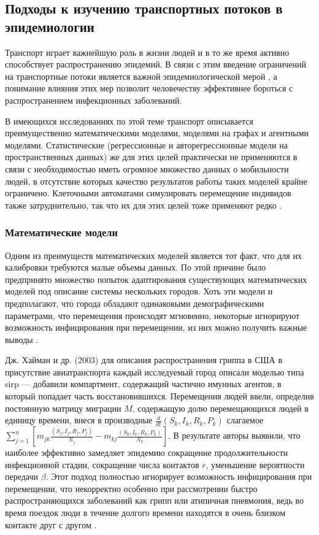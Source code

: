 \documentclass[a4paper,12pt]{article} %
\begin{document}
\subsection{Подходы к изучению транспортных потоков в эпидемиологии}
Транспорт играет важнейшую роль в жизни людей и в то же время активно способствует распространению эпидемий. В связи с этим введение ограничений на транспортные потоки является важной эпидемиологической мерой \cite{li2021modeling}, а понимание влияния этих мер позволит человечеству эффективнее бороться с распространением инфекционных заболеваний.

В имеющихся исследованиях по этой теме транспорт описывается преимущественно математическими моделями, моделями на графах и агентными моделями. Статистические (регрессионные и авторегрессионные модели на пространственных данных) же для этих целей практически не применяются в связи с необходимостью иметь огромное множество данных о мобильности людей, в отсутствие которых качество результатов работы таких моделей крайне ограничено. Клеточными автоматами симулировать перемещение индивидов также затруднительно, так что их для этих целей тоже применяют редко \cite{li2021modeling}.

\subsubsection{Математические модели}
Одним из преимуществ математических моделей является тот факт, что для их калибровки требуются малые объемы данных. По этой причине было предпринято множество попыток адаптирования существующих математических моделей под описание системы нескольких городов. Хоть эти модели и предполагают, что города обладают одинаковыми демографическими параметрами, что перемещения происходят мгновенно, некоторые игнорируют возможность инфицирования при перемещении, из них можно получить важные выводы \cite{li2021modeling}.

Дж. Хайман и др. (2003) \cite{hyman2003modeling} для описания распространения гриппа в США в присутствие авиатранспорта каждый исследуемый город описали моделью типа \gls{sirp} --- добавили компартмент, содержащий частично имунных агентов, в который попадает часть восстановившихся. Перемещения людей ввели, определив постоянную матрицу миграции $M$, содержащую долю перемещающихся людей в единицу времени, внеся в производные $\frac{d}{dt}(S_k,I_k,R_k,P_k)$ слагаемое $\sum\limits_{j=1}^n \left[m_{jk}\frac{(S_j,I_j,R_j,P_j)}{N_j}-m_{kj}\frac{(S_k,I_k,R_k,P_k)}{N_k}\right]$. В результате авторы выявили, что наиболее эффективно замедляет эпидемию сокращение продолжительности инфекционной стадии, сокращение числа контактов $r$, уменьшение вероятности передачи $\beta$. Этот подход полностью игнорирует возможность инфицирования при перемещении, что некорректно особенно при рассмотрении быстро распространяющихся заболеваний как грипп или атипичная пневмония, ведь во время поездок люди в течение долгого времени находятся в очень близком контакте друг с другом \cite{li2021modeling}.
\end{document}
